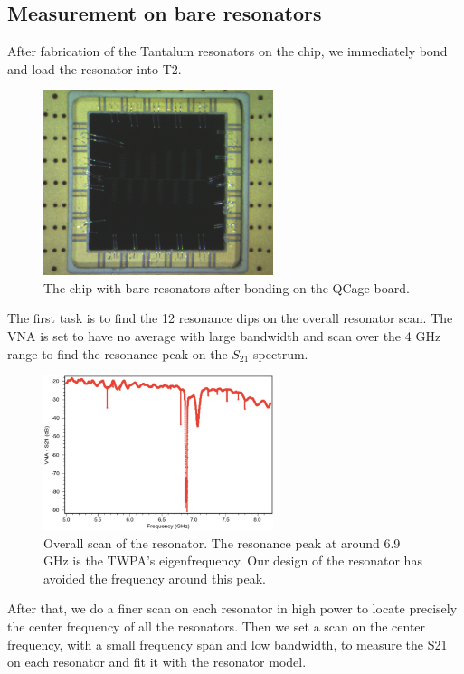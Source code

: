 \subsection{Measurement on bare resonators}
After fabrication of the Tantalum resonators 
on the chip, we immediately bond and load the resonator into T2. 
\begin{figure}[h!]
    \centering
    \includegraphics[width=0.6\textwidth]{Pic/Res_bond.png}
    \caption{The chip with bare resonators after bonding on the QCage board.}
    \label{fig:my_label}
\end{figure}
The first task is to find the 12 resonance dips on the overall resonator scan. The VNA is set to have no average with large bandwidth and scan over the 4 GHz range to find the resonance peak on the $S_{21}$ spectrum.
\begin{figure}[h!]
    \centering
    \includegraphics[width=0.6\textwidth]{Pic/Overall_res.jpg}
    \caption{Overall scan of the resonator. The resonance peak at around 6.9 GHz is the TWPA's eigenfrequency. Our design of the resonator has avoided the frequency around this peak.}
    \label{fig:my_label}
\end{figure}
After that, we do a finer scan on each resonator in high power to locate precisely the center frequency of all the resonators. Then we set a scan on the center frequency, with a small frequency span and low bandwidth, to measure the S21 on each resonator and fit it with the resonator model. 

